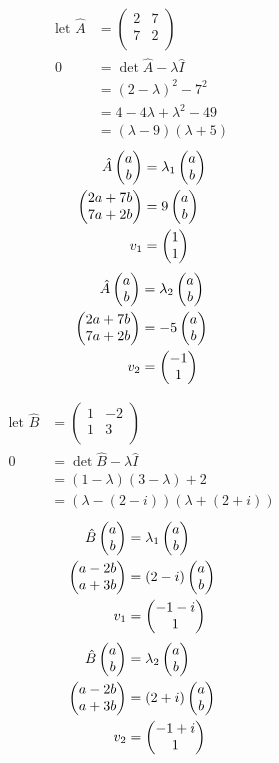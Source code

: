 \documentclass[12pt]{article}
\begin{document}
\problemsub %
\begin{align*}
\text{let $\hat{A}$} &= \left(\begin{matrix}
  2 & 7 \\
  7 & 2 \\
 \end{matrix}\right) \\
0 &= \det{\hat{A} - \lambda\hat{I}} \\
 &= (2-\lambda)^2-7^2 \\
 &= 4-4\lambda+\lambda^2-49 \\
 &= (\lambda - 9)(\lambda + 5)
\end{align*}
\begin{align*}
\hat{A}\colvec{a}{b} &= \lambda_1\colvec{a}{b} \\
\colvec{2a + 7b}{7a + 2b} &= 9\colvec{a}{b} \\
v_1 &= \colvec{1}{1}
\end{align*}
\begin{align*}
\hat{A}\colvec{a}{b} &= \lambda_2\colvec{a}{b} \\
\colvec{2a + 7b}{7a + 2b} &= -5\colvec{a}{b} \\
v_2 &= \colvec{-1}{1}
\end{align*}



\problemsub %
\begin{align*}
\text{let $\hat{B}$} &= \left(\begin{matrix}
  1 & -2 \\
  1 & 3 \\
 \end{matrix}\right) \\
0 &= \det{\hat{B} - \lambda\hat{I}} \\
 &= (1-\lambda)(3-\lambda) +2 \\
 &= (\lambda - (2-i))(\lambda + (2+i))
\end{align*}
\begin{align*}
\hat{B}\colvec{a}{b} &= \lambda_1\colvec{a}{b} \\
\colvec{a - 2b}{a + 3b} &= (2-i)\colvec{a}{b} \\
v_1 &= \colvec{-1-i}{1}
\end{align*}
\begin{align*}
\hat{B}\colvec{a}{b} &= \lambda_2\colvec{a}{b} \\
\colvec{a - 2b}{a + 3b} &= (2+i)\colvec{a}{b} \\
v_2 &= \colvec{-1+i}{1}
\end{align*}
\end{document}
